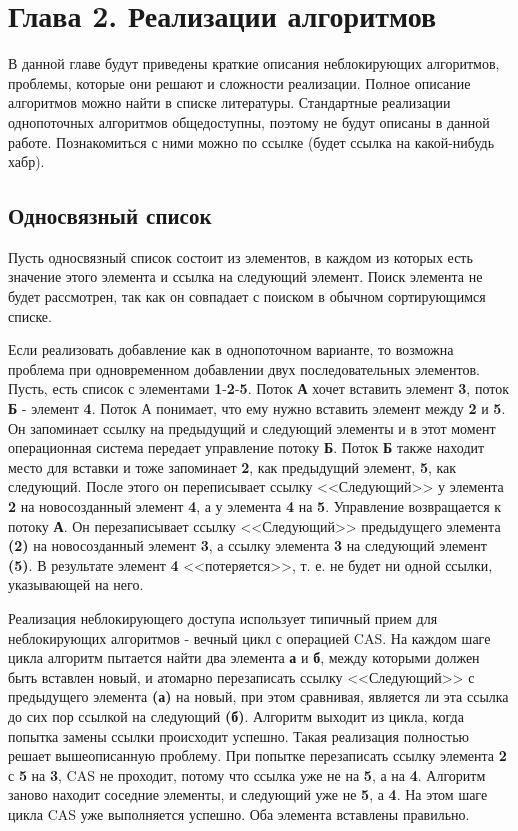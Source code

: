 \documentclass[12pt]{article}
\begin{document}
{		\newpage
		
		\section{Глава 2. Реализации алгоритмов}
			\par В данной главе будут приведены краткие описания неблокирующих алгоритмов, проблемы, которые они решают и сложности реализации. Полное описание алгоритмов можно найти в списке литературы. Стандартные реализации однопоточных алгоритмов общедоступны, поэтому не будут описаны в данной работе. Познакомиться с ними можно по ссылке (будет ссылка на какой-нибудь хабр).
			\subsection{Односвязный список}
				\par Пусть односвязный список состоит из элементов, в каждом из которых есть значение этого элемента и ссылка на следующий элемент. Поиск элемента не будет рассмотрен, так как он совпадает с поиском в обычном сортирующимся списке.
				\par Если реализовать добавление как в однопоточном варианте, то возможна проблема при одновременном добавлении двух последовательных элементов. Пусть, есть список с элементами \textbf{1}-\textbf{2}-\textbf{5}. Поток \textbf{А} хочет вставить элемент \textbf{3}, поток \textbf{Б} - элемент \textbf{4}. Поток А понимает, что ему нужно вставить элемент между \textbf{2} и \textbf{5}. Он запоминает ссылку на предыдущий и следующий элементы и в этот момент операционная система передает управление потоку \textbf{Б}. Поток \textbf{Б} также находит место для вставки и тоже запоминает \textbf{2}, как предыдущий элемент, \textbf{5}, как следующий. После этого он переписывает ссылку <<Следующий>> у элемента \textbf{2} на новосозданный элемент \textbf{4}, а у элемента \textbf{4} на \textbf{5}. Управление возвращается к потоку \textbf{А}. Он перезаписывает ссылку <<Следующий>> предыдущего элемента \textbf{(2)} на новосозданный элемент \textbf{3}, а ссылку элемента \textbf{3} на следующий элемент \textbf{(5)}. В результате элемент \textbf{4} <<потеряется>>, т. е. не будет ни одной ссылки, указывающей на него.
				\par Реализация неблокирующего доступа использует типичный прием для неблокирующих алгоритмов - вечный цикл с операцией CAS. На каждом шаге цикла алгоритм пытается найти два элемента \textbf{а} и \textbf{б}, между которыми должен быть вставлен новый, и атомарно перезаписать ссылку <<Следующий>> с предыдущего элемента \textbf{(а)} на новый, при этом сравнивая, является ли эта ссылка до сих пор ссылкой на следующий \textbf{(б)}. Алгоритм выходит из цикла, когда попытка замены ссылки происходит успешно. Такая реализация полностью решает вышеописанную проблему. При попытке перезаписать ссылку элемента \textbf{2} с \textbf{5} на \textbf{3}, CAS не проходит, потому что ссылка уже не на \textbf{5}, а на \textbf{4}. Алгоритм заново находит соседние элементы, и следующий уже не \textbf{5}, а \textbf{4}. На этом шаге цикла CAS уже выполняется успешно. Оба элемента вставлены правильно.
}
\end{document}
